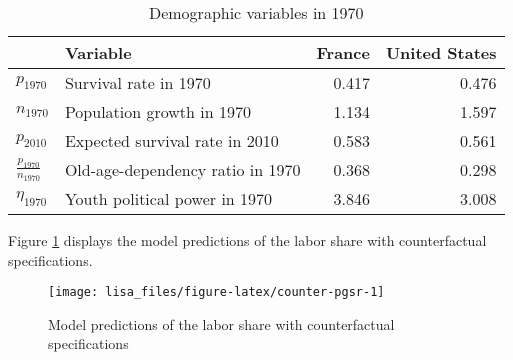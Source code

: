 \documentclass[
]{article}
\begin{document}
\begin{table}[t]

\caption{\label{tab:demo70}Demographic variables in 1970}
\centering
\begin{tabular}{llrr}
\toprule
 & Variable & France & United States\\
\midrule
$p_{1970}$ & Survival rate in 1970 & 0.417 & 0.476\\
$n_{1970}$ & Population growth in 1970 & 1.134 & 1.597\\
$p_{2010}$ & Expected survival rate in 2010 & 0.583 & 0.561\\
$\frac{p_{1970}}{n_{1970}}$ & Old-age-dependency ratio in 1970 & 0.368 & 0.298\\
$\eta_{1970}$ & Youth political power in 1970 & 3.846 & 3.008\\
\bottomrule
\end{tabular}
\end{table}

Figure \ref{fig:counter-pgsr} displays the model predictions of the labor share with counterfactual specifications.

\begin{figure}[!tb]

{\centering \texttt{[image: lisa\_files/figure-latex/counter-pgsr-1]} 

}

\caption{Model predictions of the labor share with counterfactual specifications}\label{fig:counter-pgsr}
\end{figure}
\end{document}
